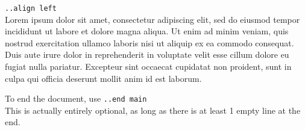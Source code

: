 \documentclass[12pt]{article}
\begin{document}
\medskip


\begin{flushleft}
\verb|..align left|\\
Lorem ipsum dolor sit amet, consectetur adipiscing elit, sed do eiusmod tempor incididunt ut labore et dolore magna aliqua. Ut enim ad minim veniam, quis nostrud exercitation ullamco laboris nisi ut aliquip ex ea commodo consequat. Duis aute irure dolor in reprehenderit in voluptate velit esse cillum dolore eu fugiat nulla pariatur. Excepteur sint occaecat cupidatat non proident, sunt in culpa qui officia deserunt mollit anim id est laborum.

\bigskip
\bigskip
\bigskip

To end the document, use \verb|..end main|\\
This is actually entirely optional, as long as there is at least 1 empty line at the end.

\end{flushleft}
\end{document}
